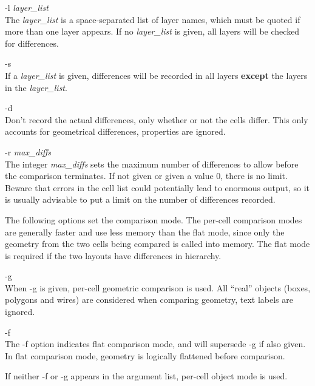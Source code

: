 \begin{description}
\item{{\vt -l} {\it layer\_list}}\\
The {\it layer\_list} is a space-separated list of layer names, which
must be quoted if more than one layer appears.  If no {\it
layer\_list} is given, all layers will be checked for differences.

\item{\vt -s}\\
If a {\it layer\_list} is given, differences will be recorded in all
layers {\bf except} the layers in the {\it layer\_list}.

\item{\vt -d}\\
Don't record the actual differences, only whether or not the cells
differ.  This only accounts for geometrical differences, properties
are ignored.

\item{{\vt -r} {\it max\_diffs}}\\
The integer {\it max\_diffs} sets the maximum number of differences to
allow before the comparison terminates.  If not given or given a value
0, there is no limit.  Beware that errors in the cell list could
potentially lead to enormous output, so it is usually advisable to put
a limit on the number of differences recorded.
\end{description}

The following options set the comparison mode.  The per-cell
comparison modes are generally faster and use less memory than the
flat mode, since only the geometry from the two cells being compared
is called into memory.  The flat mode is required if the two layouts
have differences in hierarchy.

\begin{description}
\item{\vt -g}\\
When {\vt -g} is given, per-cell geometric comparison is used.  All
``real'' objects (boxes, polygons and wires) are considered when
comparing geometry, text labels are ignored.

\item{\vt -f}\\
The {\vt -f} option indicates flat comparison mode, and will supersede
{\vt -g} if also given.  In flat comparison mode, geometry is
logically flattened before comparison.
\end{description}

If neither {\vt -f} or {\vt -g} appears in the argument list, per-cell
object mode is used.


